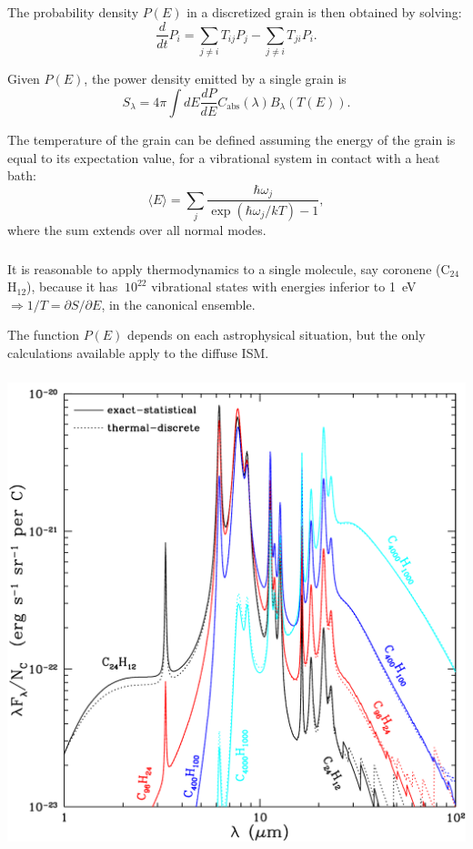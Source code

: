 \begin{frame}\frametitle{}


The probability density $P(E)$ in a discretized grain is then obtained
by solving:
\[
\frac{d}{dt} P_i = \sum_{j\ne i} T_{ij} P_j -  \sum_{j \ne i} T_{ji} P_i.
\]


Given  $P(E)$, the power density emitted by a single grain is 
\[
S_\lambda = 4 \pi \int dE \frac{dP}{dE} C_\mathrm{abs}(\lambda)
B_\lambda(T(E)).\]

The temperature of the grain can be defined assuming the energy of the
grain is equal to its expectation value, for a vibrational system in
contact with a heat bath:
\[
\langle E \rangle =  \sum_j  \frac{\hbar \omega_j
}{\exp(\hbar\omega_j/kT) -1},
\]
where the sum extends over all normal modes.

\end{frame}
\begin{frame}\frametitle{}


It is reasonable to apply thermodynamics to a single molecule, say
coronene (C$_{24}$H$_{12}$), because it has $~10^{22}$ vibrational
states with energies inferior to 1~eV $\Rightarrow 1/T=
\partial S / \partial E$, in the canonical ensemble.  


The function $P(E)$ depends on each astrophysical situation, but the
only calculations available apply to the diffuse ISM.

\end{frame}
\begin{frame}\frametitle{}


\vspace{-1cm}
\begin{center}
\includegraphics[width=!,height=0.7\textwidth]{./D/draine_li_f14.pdf}
\end{center}

\end{frame}
